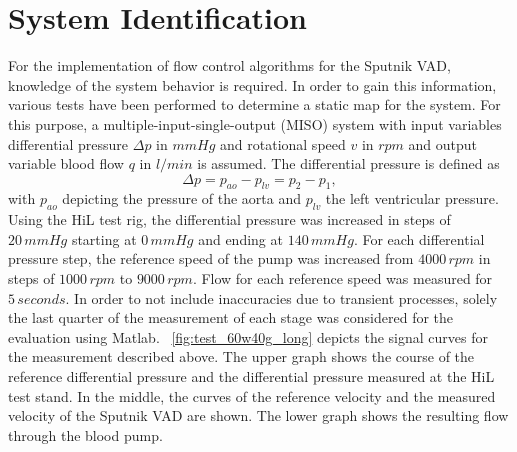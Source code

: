 \section{System Identification}
For the implementation of flow control algorithms for the Sputnik VAD, knowledge of the system behavior is required. In order to gain this information, various tests have been performed to determine a static map for the system. For this purpose, a multiple-input-single-output (MISO) system with input variables differential pressure $\Delta{p}$ in $mmHg$  and rotational speed $v$ in $rpm$ and output variable blood flow $q$ in $l/min$ is assumed. The differential pressure is defined as
\begin{equation}
  \Delta{p} = p_{ao} - p_{lv} = p_2 - p_1,
\end{equation}
with $p_{ao}$ depicting the pressure of the aorta and $p_{lv}$ the left ventricular pressure.
\\Using the HiL test rig, the differential pressure was increased in steps of $20\, mmHg$ starting at $0\,mmHg$ and ending at $140\,mmHg$. For each differential pressure step, the reference speed of the pump was increased from $4000\, rpm$ in steps of $1000\, rpm$ to $9000\, rpm$. Flow for each reference speed was measured for $5\, seconds$. In order to not include inaccuracies due to transient processes, solely the last quarter of the measurement of each stage was considered for the evaluation using Matlab. \figurename~\ref{fig:test_60w40g_long} depicts the signal curves for the measurement described above. The upper graph shows the course of the reference differential pressure and the differential pressure measured at the HiL test stand. In the middle, the curves of the reference velocity and the measured velocity of the Sputnik VAD are shown. The lower graph shows the resulting flow through the blood pump.


